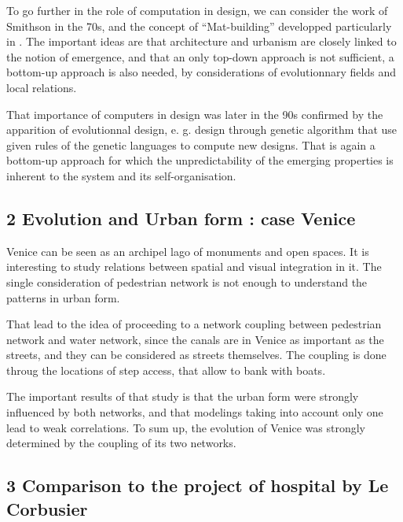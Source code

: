 \documentclass[english]{article}
\begin{document}
\bigskip{}


To go further in the role of computation in design, we can consider
the work of Smithson in the 70s, and the concept of ``Mat-building''
developped particularly in \cite{smithson1974recognize}. The important
ideas are that architecture and urbanism are closely linked to the
notion of emergence, and that an only top-down approach is not sufficient,
a bottom-up approach is also needed, by considerations of evolutionnary
fields and local relations.

\bigskip{}


That importance of computers in design was later in the 90s confirmed
by the apparition of evolutionnal design, e. g. design through genetic
algorithm that use given rules of the genetic languages to compute
new designs. That is again a bottom-up approach for which the unpredictability
of the emerging properties is inherent to the system and its self-organisation.\bigskip{}



\subsection*{2 Evolution and Urban form : case Venice}

Venice can be seen as an archipel lago of monuments and open spaces.
It is interesting to study relations between spatial and visual integration
in it. The single consideration of pedestrian network is not enough
to understand the patterns in urban form.

\bigskip{}


That lead to the idea of proceeding to a network coupling between
pedestrian network and water network, since the canals are in Venice
as important as the streets, and they can be considered as streets
themselves. The coupling is done throug the locations of step access,
that allow to bank with boats.

\bigskip{}


The important results of that study is that the urban form were strongly
influenced by both networks, and that modelings taking into account
only one lead to weak correlations. To sum up, the evolution of Venice
was strongly determined by the coupling of its two networks.

\bigskip{}



\subsection*{3 Comparison to the project of hospital by Le Corbusier}
\end{document}
